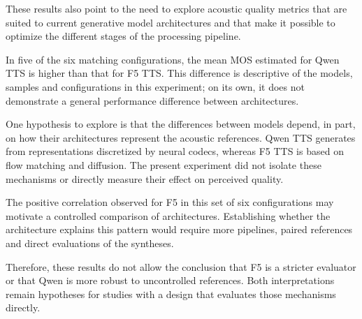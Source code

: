 These results also point to the need to explore acoustic quality metrics that are suited to current generative model architectures and that make it possible to optimize the different stages of the processing pipeline.

In five of the six matching configurations, the mean MOS estimated for Qwen TTS is higher than that for F5 TTS. This difference is descriptive of the models, samples and configurations in this experiment; on its own, it does not demonstrate a general performance difference between architectures.

One hypothesis to explore is that the differences between models depend, in part, on how their architectures represent the acoustic references. Qwen TTS generates from representations discretized by neural codecs, whereas F5 TTS is based on flow matching and diffusion. The present experiment did not isolate these mechanisms or directly measure their effect on perceived quality.

The positive correlation observed for F5 in this set of six configurations may motivate a controlled comparison of architectures. Establishing whether the architecture explains this pattern would require more pipelines, paired references and direct evaluations of the syntheses.

Therefore, these results do not allow the conclusion that F5 is a stricter evaluator or that Qwen is more robust to uncontrolled references. Both interpretations remain hypotheses for studies with a design that evaluates those mechanisms directly.

